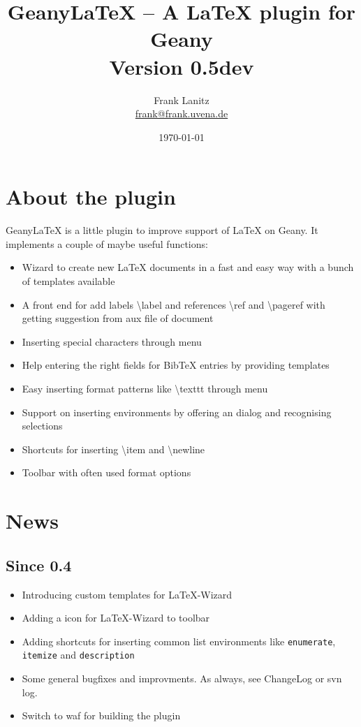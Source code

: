 \documentclass[%
a4paper,%
10pt,%
oneside,%
DIV18,
headsepline,
plainheadsepline,
footsepline,
plainfootsepline,
bibtotoc,%
liststotoc,%
BCOR12mm,%
halfparskip,%
openany,%
]{scrartcl}
\title{Geany\LaTeX{} -- A \LaTeX{} plugin for Geany \\[1.5ex]
	   \normalsize Version 0.5dev}
\author{Frank Lanitz \\ \small{\href{mailto:frank@frank.uvena.de}{frank@frank.uvena.de}}}
\date{\today}
\begin{document}
\newpage
\dedication{\normalsize \textbf{Note:} Please note the document has been created on
\today. If you are using devel version from SVN, please compile and check
\texttt{doc/geanylatex.tex} from sources. Please check page \pageref
{sec:compiling_of_documentation}, section \ref{sec:compiling_of_documentation} how to do so. }

\maketitle
\tableofcontents
\listoftables
\newpage
{}
\section{About the plugin}

Geany\LaTeX{} is a little plugin to improve support of \LaTeX{} on Geany.
It implements a couple of maybe useful functions:

\begin{itemize}
	\item Wizard to create new \LaTeX{} documents in a fast and easy way
	 	  with a bunch of templates available
	\item A front end for add labels \textbackslash label{} and
		  references \textbackslash ref{} and \textbackslash pageref{}
   		  with getting suggestion from aux file of document
	\item Inserting special characters through menu
	\item Help entering the right fields for BibTeX entries by
		  providing templates
	\item Easy inserting format patterns like \textbackslash texttt{}
		  through menu
	\item Support on inserting environments by offering an dialog and
		  recognising selections
	\item Shortcuts for inserting \textbackslash item and
		  \textbackslash newline
	\item Toolbar with often used format options
\end{itemize}

\section{News}
\subsection*{Since 0.4}
\begin{itemize}

	\item Introducing custom templates for \LaTeX-Wizard
	\item Adding a icon for \LaTeX-Wizard to toolbar
	\item Adding shortcuts for inserting common list environments
		  like \texttt{enumerate}, \texttt{itemize} and
		  \texttt{description}
	\item Some general bugfixes and improvments. As always, see
		  ChangeLog or svn log.
	\item Switch to waf for building the plugin
\end{itemize}
\end{document}

